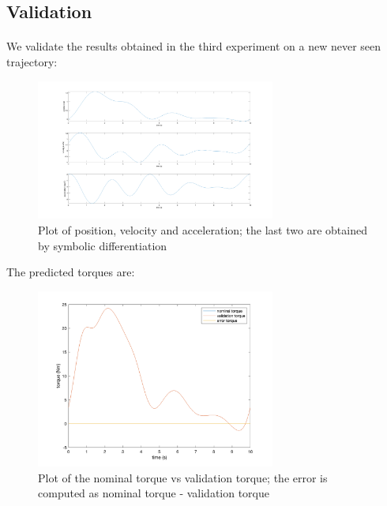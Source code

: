 \documentclass{article}
\begin{document}
\pagebreak

\subsection{Validation} \paragraph{} We validate the results obtained in the third experiment on a new never seen trajectory:

\begin{figure}[!htbp]
\centering
\includegraphics[width=0.7\textwidth]{images/1-dof/validation_trajectory.png}
\caption{Plot of position, velocity and acceleration; the last two are obtained by symbolic differentiation}
\end{figure}
\FloatBarrier

The predicted torques are:

\begin{figure}[!htbp]
\centering
\includegraphics[width=0.7\textwidth]{images/1-dof/validation.png}
\caption{Plot of the nominal torque vs validation torque; the error is computed as nominal torque - validation torque}
\end{figure}
\FloatBarrier

\pagebreak
\end{document}
